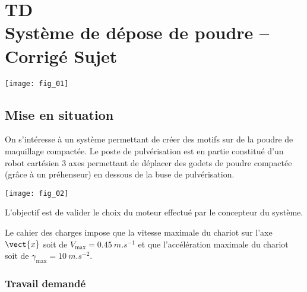 \chapter*{TD  \\ 
Système de dépose de poudre -- \ifprof Corrigé \else Sujet \fi}

\iflivret {} \else
\ifprof  {} \else \fi
\fi

\setcounter{question}{0}


\begin{marginfigure} [4cm]
\texttt{[image: fig\_01]}
\end{marginfigure}




\section*{Mise en situation}
\ifprof
\else
On s'intéresse à un système permettant de créer des motifs sur de la poudre de maquillage compactée. Le poste de pulvérisation est en partie constitué d'un robot cartésien 3 axes permettant de déplacer des godets de poudre compactée (grâce à un préhenseur) en dessous de la buse de pulvérisation. 

\begin{center}
\texttt{[image: fig\_02]}
\end{center}

\fi

\begin{obj}
L’objectif est de valider le choix du moteur effectué par le concepteur du système.

Le cahier des charges impose que la vitesse maximale du chariot sur l’axe $\vect{x}$ soit de $V_{\text{max}}= \SI{0,45}{m.s^{-1}}$ et que l’accélération maximale du chariot soit de $\gamma_{\text{max}}= \SI{10}{m.s^{-2}}$.
\end{obj}

\subsection*{Travail demandé}

